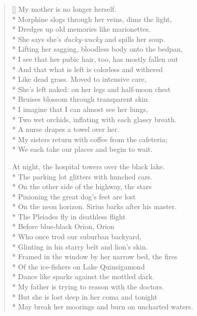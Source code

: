 \label{ch:atdawn}
\settowidth{\versewidth}{May break her moorings and burn on uncharted waters.}
\begin{verse}[\versewidth]
My mother is no longer herself.\\*
Morphine slogs through her veins, dims the light,\\*
Dredges up old memories like marionettes.\\*
She says she's \textit{ducky-wucky} and spills her soup.\\*
Lifting her sagging, bloodless body onto the bedpan,\\*
I see that her pubic hair, too, has mostly fallen out\\*
And that what is left is colorless and withered\\*
Like dead grass. Moved to intensive care,\\*
She's left naked: on her legs and half-moon chest\\*
Bruises blossom through transparent skin.\\*
I imagine that I can almost see her lungs,\\*
Two wet orchids, inflating with each glassy breath.\\*
A nurse drapes a towel over her.\\*
My sisters return with coffee from the cafeteria;\\*
We each take our places and begin to wait.

At night, the hospital towers over the black lake.\\*
The parking lot glitters with hunched cars.\\*
On the other side of the highway, the stars\\*
Pinioning the great dog's feet are lost\\*
On the neon horizon. Sirius barks after his master.\\*
The Pleiades fly in deathless flight\\*
Before blue-black Orion, Orion\\*
Who once trod our suburban backyard,\\*
Glinting in his starry belt and lion's skin.\\*
Framed in the window by her narrow bed, the fires\\*
Of the ice-fishers on Lake Quinsigamond\\*
Dance like sparks against the mottled dark.\\*
My father is trying to reason with the doctors.\\*
But she is lost deep in her coma and tonight\\*
May break her moorings and burn on uncharted waters.


\end{verse}
